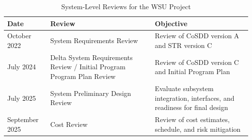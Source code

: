 \begin{table}[htbp]
\centering
\begin{tabularx}{\textwidth}{|l|X|X|}
\hline
\textbf{Date} & \textbf{Review} & \textbf{Objective} \\
\hline
October 2022 & System Requirements Review & Review of CoSDD version A and STR version C\\
\hline
July 2024 & Delta System Requirements Review / Initial Program Program Plan Review & Review of CoSDD version C and Initial Program Plan \\
\hline
July 2025 & System Preliminary Design Review & Evaluate subsystem integration, interfaces, and readiness for final design \\
\hline
September 2025 & Cost Review & Review of cost estimates, schedule, and risk mitigation \\
\hline
 \end{tabularx}
\caption{System-Level Reviews for the WSU Project}
\label{tbl:status_reviews}
\end{table}